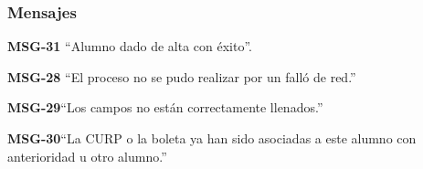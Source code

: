 \subsubsection{Mensajes}

\begin{Citemize}
    \item {\bf MSG-31} ``Alumno dado de alta con éxito''.
    \item {\bf MSG-28}  ``El proceso no se pudo realizar por un falló de red.''
    \item {\bf MSG-29}{``Los campos no están correctamente llenados.''}
    \item {\bf MSG-30}{``La CURP o la boleta ya han sido asociadas a este alumno con anterioridad u otro alumno.''}
\end{Citemize}
